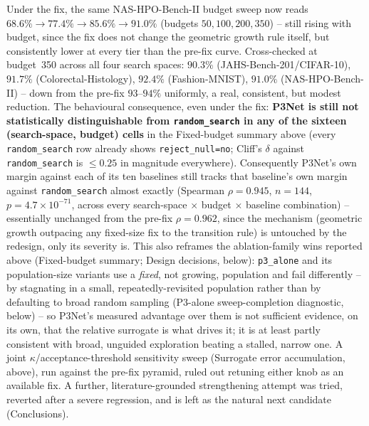 Under the fix, the same NAS-HPO-Bench-II budget sweep now reads $68.6\%\to77.4\%\to85.6\%\to91.0\%$
(budgets $50,100,200,350$) -- still rising with budget, since the fix does not change the geometric growth
rule itself, but consistently lower at every tier than the pre-fix curve. Cross-checked at budget~350 across
all four search spaces: $90.3\%$ (JAHS-Bench-201/CIFAR-10), $91.7\%$ (Colorectal-Histology), $92.4\%$
(Fashion-MNIST), $91.0\%$ (NAS-HPO-Bench-II) -- down from the pre-fix $93$--$94\%$ uniformly, a real,
consistent, but modest reduction. The behavioural consequence, even under the fix:
\textbf{P3Net is still not statistically distinguishable from \texttt{random\_search} in any of the sixteen
(search-space, budget) cells} in the Fixed-budget summary above (every \texttt{random\_search} row already
shows \texttt{reject\_null=no}; Cliff's $\delta$ against \texttt{random\_search} is $\leq 0.25$ in magnitude
everywhere). Consequently P3Net's own margin against each of its ten baselines still tracks that baseline's
own margin against \texttt{random\_search} almost exactly (Spearman $\rho=0.945$, $n=144$, $p=4.7\times
10^{-71}$, across every search-space $\times$ budget $\times$ baseline combination) -- essentially unchanged
from the pre-fix $\rho=0.962$, since the mechanism (geometric growth outpacing any fixed-size fix to the
transition rule) is untouched by the redesign, only its severity is. This also reframes the ablation-family
wins reported above (Fixed-budget summary; Design decisions, below): \texttt{p3\_alone} and its
population-size variants use a \emph{fixed}, not growing, population and fail differently -- by stagnating
in a small, repeatedly-revisited population rather than by defaulting to broad random sampling (P3-alone
sweep-completion diagnostic, below) -- so P3Net's measured advantage over them is not sufficient evidence,
on its own, that the relative surrogate is what drives it; it is at least partly consistent with broad,
unguided exploration beating a stalled, narrow one. A joint $\kappa$/acceptance-threshold sensitivity sweep (Surrogate error accumulation, above), run against the
pre-fix pyramid, ruled out retuning either knob as an available fix. A further, literature-grounded
strengthening attempt was tried, reverted after a severe regression, and is left as the natural next
candidate (Conclusions).

